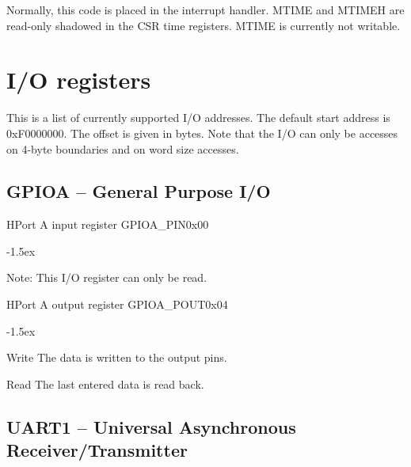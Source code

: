 \documentclass[12pt]{article}
\begin{document}
Normally, this code is placed in the interrupt handler. MTIME and MTIMEH are read-only shadowed in the CSR time registers. MTIME is currently not writable.

\section{I/O registers}
\label{sec:ioregisters}
This is a list of currently supported I/O addresses. 
The default start address is 0xF0000000. The offset is given in bytes. Note that the I/O can only be accesses on 4-byte boundaries and on word size accesses.

\subsection{GPIOA -- General Purpose I/O}

\begin{register}{H}{Port A input register GPIOA\_PIN}{0x00}%
\label{pinx}%
\regnewline%
\end{register}
\begin{regdesc}[0.6\textwidth]\begin{reglist}[000000000]
\itemsep-1.5ex
\item[Note:] This I/O register can only be read.
\end{reglist}\end{regdesc}

\begin{register}{H}{Port A output register GPIOA\_POUT}{0x04}%
\label{poutx}%
\regnewline%
\end{register}
\begin{regdesc}[0.6\textwidth]\begin{reglist}[000000000]
\itemsep-1.5ex
\item[Write] The data is written to the output pins.
\item[Read] The last entered data is read back.
\end{reglist}\end{regdesc}


\subsection{UART1 -- Universal Asynchronous Receiver/Transmitter}
\end{document}
